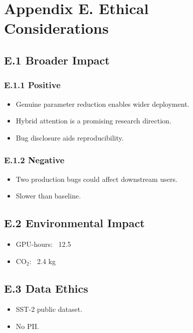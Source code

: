 
\section{Appendix E. Ethical Considerations}

\subsection{E.1 Broader Impact}

\subsubsection{E.1.1 Positive}

\begin{itemize}
\item Genuine parameter reduction enables wider deployment.
\item Hybrid attention is a promising research direction.
\item Bug disclosure aids reproducibility.

\end{itemize}
\subsubsection{E.1.2 Negative}

\begin{itemize}
\item Two production bugs could affect downstream users.
\item Slower than baseline.

\end{itemize}
\subsection{E.2 Environmental Impact}

\begin{itemize}
\item GPU-hours: ~12.5
\item CO$_2$: ~2.4 kg

\end{itemize}
\subsection{E.3 Data Ethics}

\begin{itemize}
\item SST-2 public dataset.
\item No PII.

\end{itemize}
